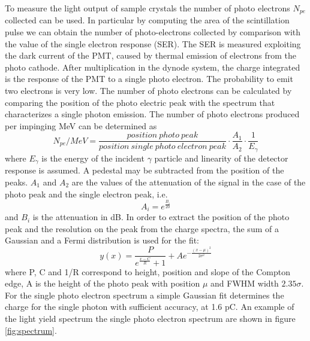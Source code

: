 To measure the light output of sample crystals the number of photo electrons $N_{pe}$ collected can be used.
In particular by computing the area of the scintillation pulse we can obtain the number of photo-electrons collected by comparison with the value of the single electron response (SER).
The SER is measured exploiting the dark current of the PMT, caused by thermal emission of electrons from the photo cathode.
After multiplication in the dynode system, the charge integrated is the response of the PMT to a single photo electron.
The probability to emit two electrons is very low.
The number of photo electrons can be calculated by comparing the position of the photo electric peak with the spectrum that characterizes a single photon emission. The number of photo electrons produced per impinging MeV can be determined as
\begin{equation}
N_{pe}/MeV=\frac{position\ photo\ peak}{position\ single\ photo\ electron\ peak} \cdot \frac{A_{1}}{A_{2}} \cdot \frac{1}{E_{\gamma}}
\end{equation}
where $E_{\gamma}$ is the energy of the incident $\gamma$ particle and linearity of the detector response is assumed. A pedestal may be subtracted from the position of the peaks. $A_{1}$ and $A_{2}$ are the values of the attenuation of the signal in the case of the photo peak and the single electron peak, i.e.
\begin{equation}
A_{i}=e^{\frac{B_{i}}{20}}
\end{equation}
and $B_{i}$ is the attenuation in dB.
In order to extract the position of the photo peak and the resolution on the peak  from the charge spectra, the sum of a Gaussian and a Fermi distribution is used for the fit:
\begin{equation}
y(x)=\frac{P}{e^{\frac{x-C}{R}}+1}+Ae^{-\frac{(x-\mu)^{2}}{2\sigma ^{2}}}
\end{equation}
where P, C and 1/R correspond to height, position and slope of the Compton edge, A is the height of the photo peak with position $\mu$ and FWHM width $2.35\sigma$.
For the single photo electron spectrum a simple Gaussian fit determines the charge for the single photon with sufficient accuracy, at 1.6 pC.
An example of the light yield spectrum the single photo electron spectrum are shown in figure \ref{fig:spectrum}.
